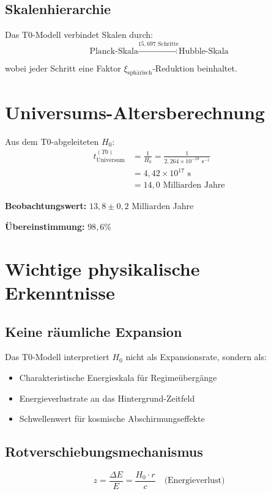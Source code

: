 \documentclass[12pt,a4paper]{article}
\begin{document}
	\subsection{Skalenhierarchie}
	Das T0-Modell verbindet Skalen durch:
	\begin{equation}
		\text{Planck-Skala} \xrightarrow{15{,}697 \text{ Schritte}} \text{Hubble-Skala}
	\end{equation}
	
	wobei jeder Schritt eine Faktor $\xi_{\text{sphärisch}}$-Reduktion beinhaltet.
	
	\section{Universums-Altersberechnung}
	
	Aus dem T0-abgeleiteten $H_0$:
	\begin{align}
		t_{\text{Universum}}^{(T0)} &= \frac{1}{H_0} = \frac{1}{2{,}264 \times 10^{-18} \text{ s}^{-1}} \\
		&= 4{,}42 \times 10^{17} \text{ s} \\
		&= 14{,}0 \text{ Milliarden Jahre}
	\end{align}
	
	\textbf{Beobachtungswert:} $13{,}8 \pm 0{,}2$ Milliarden Jahre
	
	\textbf{Übereinstimmung:} $98{,}6\%$
	
	\section{Wichtige physikalische Erkenntnisse}
	
	\subsection{Keine räumliche Expansion}
	Das T0-Modell interpretiert $H_0$ nicht als Expansionsrate, sondern als:
	\begin{itemize}
		\item Charakteristische Energieskala für Regimeübergänge
		\item Energieverlustrate an das Hintergrund-Zeitfeld
		\item Schwellenwert für kosmische Abschirmungseffekte
	\end{itemize}
	
	\subsection{Rotverschiebungsmechanismus}
	\begin{equation}
		z = \frac{\Delta E}{E} = \frac{H_0 \cdot r}{c} \quad \text{(Energieverlust)}
	\end{equation}
	
\end{document}
